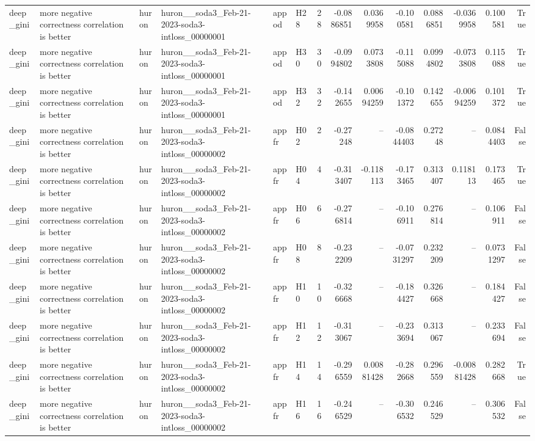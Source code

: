 \begin{longtable}{llllllrrrrrrrr}
deep\_gini & more negative correctness correlation is better & huron & huron\_\_soda3\_Feb-21-2023-soda3-intloss\_00000001 & appod & H28 & 28 & -0.0886851 & 0.0369958 & -0.100581 & 0.0886851 & -0.0369958 & 0.100581 & True \\
deep\_gini & more negative correctness correlation is better & huron & huron\_\_soda3\_Feb-21-2023-soda3-intloss\_00000001 & appod & H30 & 30 & -0.0994802 & 0.0733808 & -0.115088 & 0.0994802 & -0.0733808 & 0.115088 & True \\
deep\_gini & more negative correctness correlation is better & huron & huron\_\_soda3\_Feb-21-2023-soda3-intloss\_00000001 & appod & H32 & 32 & -0.142655 & 0.00694259 & -0.101372 & 0.142655 & -0.00694259 & 0.101372 & True \\
deep\_gini & more negative correctness correlation is better & huron & huron\_\_soda3\_Feb-21-2023-soda3-intloss\_00000002 & appfr & H02 & 2 & -0.27248 & -- & -0.0844403 & 0.27248 & -- & 0.0844403 & False \\
deep\_gini & more negative correctness correlation is better & huron & huron\_\_soda3\_Feb-21-2023-soda3-intloss\_00000002 & appfr & H04 & 4 & -0.313407 & -0.118113 & -0.173465 & 0.313407 & 0.118113 & 0.173465 & True \\
deep\_gini & more negative correctness correlation is better & huron & huron\_\_soda3\_Feb-21-2023-soda3-intloss\_00000002 & appfr & H06 & 6 & -0.276814 & -- & -0.106911 & 0.276814 & -- & 0.106911 & False \\
deep\_gini & more negative correctness correlation is better & huron & huron\_\_soda3\_Feb-21-2023-soda3-intloss\_00000002 & appfr & H08 & 8 & -0.232209 & -- & -0.0731297 & 0.232209 & -- & 0.0731297 & False \\
deep\_gini & more negative correctness correlation is better & huron & huron\_\_soda3\_Feb-21-2023-soda3-intloss\_00000002 & appfr & H10 & 10 & -0.326668 & -- & -0.184427 & 0.326668 & -- & 0.184427 & False \\
deep\_gini & more negative correctness correlation is better & huron & huron\_\_soda3\_Feb-21-2023-soda3-intloss\_00000002 & appfr & H12 & 12 & -0.313067 & -- & -0.233694 & 0.313067 & -- & 0.233694 & False \\
deep\_gini & more negative correctness correlation is better & huron & huron\_\_soda3\_Feb-21-2023-soda3-intloss\_00000002 & appfr & H14 & 14 & -0.296559 & 0.00881428 & -0.282668 & 0.296559 & -0.00881428 & 0.282668 & True \\
deep\_gini & more negative correctness correlation is better & huron & huron\_\_soda3\_Feb-21-2023-soda3-intloss\_00000002 & appfr & H16 & 16 & -0.246529 & -- & -0.306532 & 0.246529 & -- & 0.306532 & False \\

\end{longtable}
